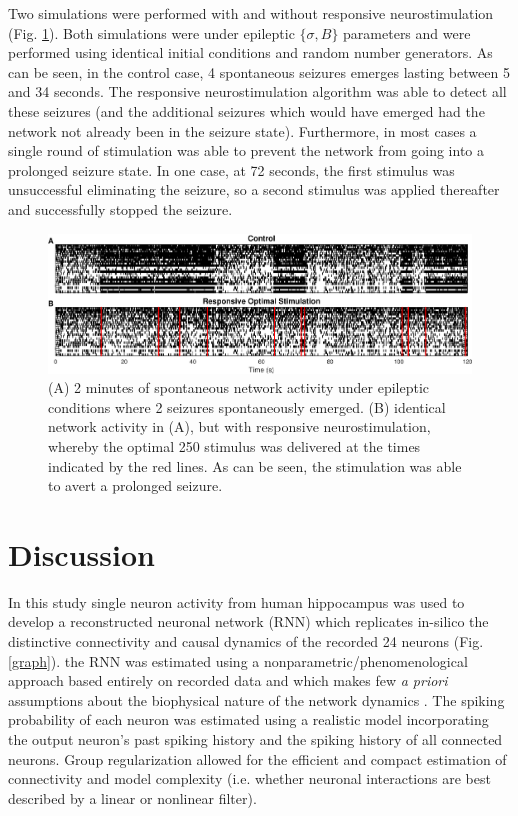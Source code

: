 \documentclass[journal,twoside,web]{ieeecolor}
\newcommand{\nn}{24}    %
\newcommand{\len}{250}   %
\begin{document}
Two simulations were performed with and without responsive neurostimulation (Fig. \ref{RS}).
Both simulations were under epileptic $\{\sigma,B\}$ parameters and were performed using identical initial conditions and random number generators.
As can be seen, in the control case, 4 spontaneous seizures emerges lasting between 5 and 34 seconds.
The responsive neurostimulation algorithm was able to detect all these seizures (and the additional seizures which would have emerged had the network not already been in the seizure state).
Furthermore, in most cases a single round of stimulation was able to prevent the network from going into a prolonged seizure state.
In one case, at 72 seconds, the first stimulus was unsuccessful eliminating the seizure, so a second stimulus was applied thereafter and successfully stopped the seizure.

\begin{figure}[!ht]
\centering
\includegraphics[width=180mm]{RS}
\caption[Responsive Stimulation]{
(A) 2 minutes of spontaneous network activity under epileptic conditions where 2 seizures spontaneously emerged.
(B) identical network activity in (A), but with responsive neurostimulation, whereby the optimal \len{} stimulus was delivered at the times indicated by the red lines. As can be seen, the stimulation was able to avert a prolonged seizure.}
\label{RS}
\end{figure}

\section{Discussion \label{disc}}

In this study single neuron activity from human hippocampus was used to develop a reconstructed neuronal network (RNN) which replicates in-silico the distinctive connectivity and causal dynamics of the recorded \nn{} neurons (Fig. \ref{graph}).
the RNN was estimated using a nonparametric/phenomenological approach based entirely on recorded data and which makes few \textit{a priori} assumptions about the biophysical nature of the network dynamics \cite{pillow08}.
The spiking probability of each neuron was estimated using a realistic model incorporating the output neuron's past spiking history and the spiking history of all connected neurons.
Group regularization allowed for the efficient and compact estimation of connectivity and model complexity (i.e. whether neuronal interactions are best described by a linear or nonlinear filter).
\end{document}

